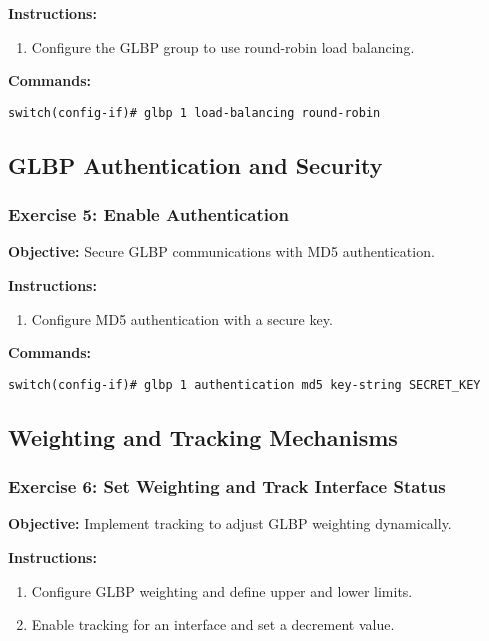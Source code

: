 \documentclass[12pt]{article}
\begin{document}
\textbf{Instructions:}
\begin{enumerate}
\item Configure the GLBP group to use round-robin load balancing.
\end{enumerate}

\textbf{Commands:}
\begin{lstlisting}[style=CiscoCLI]
switch(config-if)# glbp 1 load-balancing round-robin
\end{lstlisting}

\bigskip

\subsection{GLBP Authentication and Security}

\subsubsection*{Exercise 5: Enable Authentication}
\textbf{Objective:} Secure GLBP communications with MD5 authentication.

\textbf{Instructions:}
\begin{enumerate}
\item Configure MD5 authentication with a secure key.
\end{enumerate}

\textbf{Commands:}
\begin{lstlisting}[style=CiscoCLI]
switch(config-if)# glbp 1 authentication md5 key-string SECRET_KEY
\end{lstlisting}

\bigskip

\subsection{Weighting and Tracking Mechanisms}

\subsubsection*{Exercise 6: Set Weighting and Track Interface Status}
\textbf{Objective:} Implement tracking to adjust GLBP weighting dynamically.

\textbf{Instructions:}
\begin{enumerate}
\item Configure GLBP weighting and define upper and lower limits.
\item Enable tracking for an interface and set a decrement value.
\end{enumerate}
\end{document}
